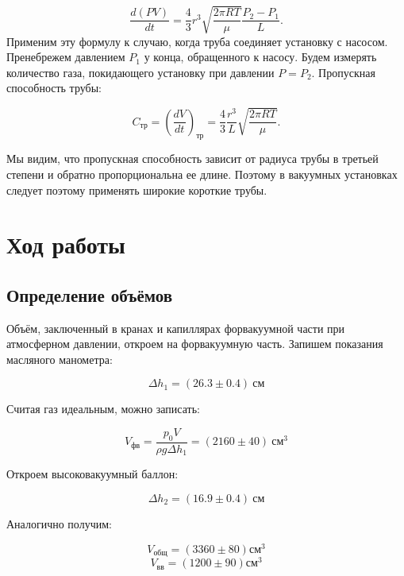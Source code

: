 \documentclass[a4paper]{article}
\begin{document}
\begin{equation}
\label{formula}
	\frac{d(PV)}{dt}=\frac{4}{3}r^3 \sqrt{\frac{2\pi RT}{\mu}} \frac{P_2-P_1}{L}.
\end{equation}
Применим эту формулу к случаю, когда труба соединяет установку с насосом.
Пренебрежем давлением $P_1$ у конца, обращенного к насосу.
Будем измерять количество газа, покидающего установку при давлении $P = P_2$.
Пропускная способность трубы:

\begin{equation}
	C_\text{тр}=(\frac{dV}{dt})_\text{тр}=\frac{4}{3}\frac{r^3}{L}\sqrt{\frac{2\pi RT}{\mu}}.
\end{equation}

Мы видим, что пропускная способность зависит от радиуса трубы в третьей степени
и обратно пропорциональна ее длине.
Поэтому в вакуумных установках следует поэтому применять широкие короткие трубы.

\section{Ход работы}

\subsection{Определение объёмов}

Объём, заключенный в кранах и капиллярах форвакуумной части при атмосферном давлении,
откроем на форвакуумную часть. Запишем показания масляного манометра:

\begin{equation}
    \Delta h_1 = (26.3 \pm 0.4) \ \text{см}
\end{equation}

Считая газ идеальным, можно записать:

\begin{equation}
    V_\text{фв} = \frac{p_0 V}{\rho g \Delta h_1} = (2160 \pm 40) \ \text{см}^3
\end{equation}

Откроем высоковакуумный баллон:

\begin{equation}
    \Delta h_2 = (16.9 \pm 0.4) \ \text{см}
\end{equation}

Аналогично получим:

\begin{equation}
    V_\text{общ} = (3360 \pm 80) \text{см}^3
\end{equation}
\begin{equation}
    V_\text{вв} = (1200 \pm 90) \text{см}^3
\end{equation}
\end{document}
